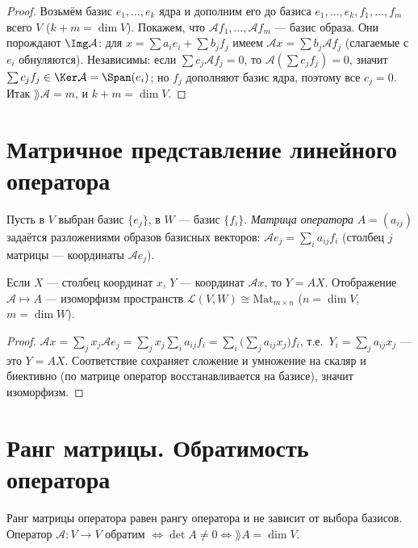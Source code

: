 \begin{proof}
Возьмём базис $e_1,\dots,e_k$ ядра и дополним его до базиса $e_1,\dots,e_k,f_1,\dots,f_m$ всего $V$
($k+m=\dim V$). Покажем, что $\mathcal Af_1,\dots,\mathcal Af_m$ — базис образа. Они порождают
$\Img\mathcal A$: для $x=\sum a_ie_i+\sum b_jf_j$ имеем $\mathcal Ax=\sum b_j\mathcal Af_j$
(слагаемые с $e_i$ обнуляются). Независимы: если $\sum c_j\mathcal Af_j=0$, то
$\mathcal A(\sum c_jf_j)=0$, значит $\sum c_jf_j\in\Ker\mathcal A=\Span(e_i)$; но $f_j$ дополняют
базис ядра, поэтому все $c_j=0$. Итак $\rang\mathcal A=m$, и $k+m=\dim V$.
\end{proof}

\section{Матричное представление линейного оператора}

\begin{definition}
Пусть в $V$ выбран базис $\{e_j\}$, в $W$ — базис $\{f_i\}$. \emph{Матрица оператора}
$A=(a_{ij})$ задаётся разложениями образов базисных векторов: $\mathcal Ae_j=\sum_i a_{ij}f_i$
(столбец $j$ матрицы — координаты $\mathcal Ae_j$).
\end{definition}

\begin{theorem}
Если $X$ — столбец координат $x$, $Y$ — координат $\mathcal Ax$, то $Y=AX$. Отображение
$\mathcal A\mapsto A$ — изоморфизм пространств $\mathcal L(V,W)\cong\mathrm{Mat}_{m\times n}$
($n=\dim V$, $m=\dim W$).
\end{theorem}

\begin{proof}
$\mathcal Ax=\sum_j x_j\mathcal Ae_j=\sum_j x_j\sum_i a_{ij}f_i=\sum_i\bigl(\sum_j a_{ij}x_j\bigr)f_i$,
т.е.\ $Y_i=\sum_j a_{ij}x_j$ — это $Y=AX$. Соответствие сохраняет сложение и умножение на скаляр и
биективно (по матрице оператор восстанавливается на базисе), значит изоморфизм.
\end{proof}

\section{Ранг матрицы. Обратимость оператора}

\begin{theorem}
Ранг матрицы оператора равен рангу оператора и не зависит от выбора базисов. Оператор
$\mathcal A\colon V\to V$ обратим $\iff\det A\ne0\iff\rang A=\dim V$.
\end{theorem}

